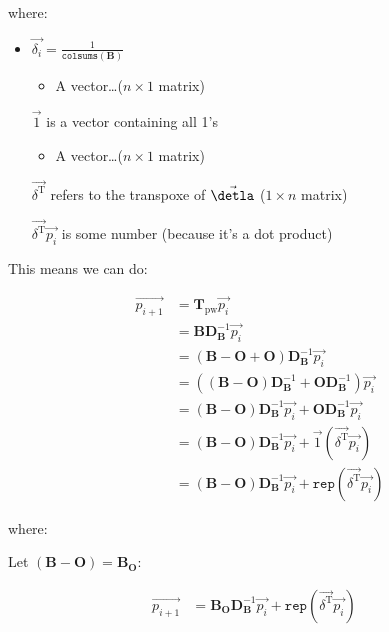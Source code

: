 \documentclass[11pt]{article}
\begin{document}
\begin{enumerate}
where:

\begin{itemize}
\item \(\vec{\delta_i} = \frac{1}{\mathtt{colsums} \left( \mathbf{B} \right)}\)
\begin{itemize}
\item A vector\ldots{}(\(n\times 1\) matrix)
\end{itemize}
\item[{\(\vec{1}\) }] is a vector containing all 1's
\begin{itemize}
\item A vector\ldots{}(\(n\times 1\) matrix)
\end{itemize}
\item[{\(\vec{\delta^{\mathrm{T}}}\)}] refers to the transpoxe of \(\vec{\detla}\) (\(1\times n\) matrix)
\item[{\(\vec{\delta^{\mathrm{T}}} \vec{p_{i}}\)}] is some number (because it's a dot product)
\end{itemize}

This means we can do:

\begin{align}
  \overrightarrow{p_{i + 1}} & = \mathbf{T}_{\mathrm{pw}}
  \overrightarrow{p_i}\\
& = \mathbf{BD}_{\mathbf{B}}^{- 1}
  \overrightarrow{p_i}\\
  & = \left( \mathbf{B} - \mathbf{O} + \mathbf{O} \right)
  \mathbf{D}_{\mathbf{B}}^{- 1} \overrightarrow{p_i}\\
  & = \left( \left( \mathbf{B} - \mathbf{O} \right)
  \mathbf{D}_{\mathbf{B}}^{- 1} + \mathbf{OD}_{\mathbf{B}}^{- 1} \right)
  \overrightarrow{p_i}\\
  & = \left( \mathbf{B} - \mathbf{O} \right) \mathbf{D}_{\mathbf{B}}^{- 1}
  \overrightarrow{p_i} + \mathbf{OD}_{\mathbf{B}}^{- 1} \overrightarrow{p_i}\\
  & = \left( \mathbf{B} - \mathbf{O} \right) \mathbf{D}_{\mathbf{B}}^{- 1}
  \overrightarrow{p_i} + \vec{1} (\overrightarrow{\delta^{\mathrm{T}}}
  \overrightarrow{p_i}) \\
  & = \left( \mathbf{B} - \mathbf{O} \right) \mathbf{D}_{\mathbf{B}}^{- 1}
  \overrightarrow{p_i} + \mathtt{rep} (\overrightarrow{\delta^{\mathrm{T}}}
  \overrightarrow{p_i})
\end{align}

where:


Let \((\mathbf{B}-\mathbf{O}) = \mathbf{B_{\mathbf{O}}}\):

\begin{eqnarray*}
  \overrightarrow{p_{i + 1}} & = \mathbf{B_{\mathbf{O}}} \mathbf{D}_{\mathbf{B}}^{- 1}
  \overrightarrow{p_i} + \mathtt{rep} (\overrightarrow{\delta^{\mathrm{T}}}
  \overrightarrow{p_i}) &
\end{eqnarray*}


\end{enumerate}
\end{document}
